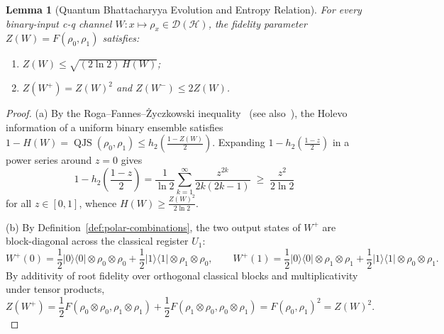 \documentclass[10pt,a4paper]{article}
\numberwithin{equation}{section}
\theoremstyle{plain}
\newtheorem{lemma}[theorem]{Lemma}
\theoremstyle{definition}
\theoremstyle{remark}
\DeclareMathOperator{\QJS}{QJS}
\newcommand{\cH}{\mathcal{H}}
\newcommand{\cD}{\mathcal{D}}
\newcommand{\ketbra}[1]{\lvert #1 \rangle\langle #1 \rvert}
\begin{document}
\begin{lemma}[Quantum Bhattacharyya Evolution and Entropy Relation]\label{lem:bhattacharyya}
For every binary-input c-q channel $W : x \mapsto \rho_x \in \cD(\cH)$, the fidelity parameter $Z(W) = F(\rho_0, \rho_1)$ satisfies:
\begin{enumerate}
\item[\textup{(a)}] $Z(W) \le \sqrt{(2 \ln 2)\, H(W)}$;
\item[\textup{(b)}] $Z(W^+) = Z(W)^2$ and $Z(W^-) \le 2 Z(W)$.
\end{enumerate}
\end{lemma}

\begin{proof}
(a) By the Roga--Fannes--\.{Z}yczkowski inequality~\cite{RogaFannesZyczkowski2010} (see also~\cite[Theorem~V.3]{HircheReeb2018}), the Holevo information of a uniform binary ensemble satisfies $1 - H(W) = \QJS(\rho_0, \rho_1) \le h_2(\frac{1 - Z(W)}{2})$. Expanding $1 - h_2(\frac{1 - z}{2})$ in a power series around $z = 0$ gives
\[
1 - h_2\!\left(\frac{1 - z}{2}\right) = \frac{1}{\ln 2}\sum_{k=1}^{\infty} \frac{z^{2k}}{2k(2k - 1)} \;\ge\; \frac{z^2}{2\ln 2}
\]
for all $z \in [0,1]$, whence $H(W) \ge \frac{Z(W)^2}{2\ln 2}$.

(b) By Definition~\ref{def:polar-combinations}, the two output states of $W^+$ are block-diagonal across the classical register $U_1$:
\[
W^+(0) = \frac{1}{2}\ketbra{0} \otimes \rho_0 \otimes \rho_0 + \frac{1}{2}\ketbra{1} \otimes \rho_1 \otimes \rho_0, \qquad
W^+(1) = \frac{1}{2}\ketbra{0} \otimes \rho_1 \otimes \rho_1 + \frac{1}{2}\ketbra{1} \otimes \rho_0 \otimes \rho_1.
\]
By additivity of root fidelity over orthogonal classical blocks and multiplicativity under tensor products,
\[
Z(W^+) = \frac{1}{2} F(\rho_0 \otimes \rho_0, \rho_1 \otimes \rho_1) + \frac{1}{2} F(\rho_1 \otimes \rho_0, \rho_0 \otimes \rho_1) = F(\rho_0, \rho_1)^2 = Z(W)^2.
\]


\end{proof}
\end{document}
